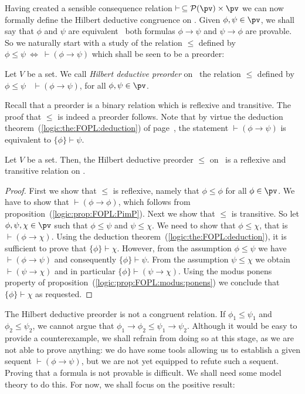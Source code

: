 Having created a sensible consequence relation $\vdash\,\subseteq
{\cal P}(\pv)\times\pv$ we can now formally define the Hilbert
deductive congruence on \pv. Given $\phi,\psi\in\pv$, we shall say
that $\phi$ and $\psi$ are equivalent \ifand\ both formulas
$\phi\to\psi$ and $\psi\to\phi$ are provable. So we naturally start
with a study of the relation $\leq$ defined by $\phi\leq\psi\
\Leftrightarrow\ \vdash(\phi\to\psi)$ which shall be seen to be a
preorder: \index{preorder@Hilbert deductive preorder}
\begin{defin}\label{logic:def:FOPL:HDC:quasiorder}
Let $V$ be a set. We call {\em Hilbert deductive preorder} on \pv\
the relation $\leq$ defined by $\phi\leq\psi$ \ifand\
$\vdash(\phi\to\psi)$, for all $\phi,\psi\in\pv$.
\end{defin}
Recall that a preorder is a binary relation which is reflexive and
transitive. The proof that $\leq$ is indeed a preorder follows. Note
that by virtue the deduction
theorem~(\ref{logic:the:FOPL:deduction}) of
page~\pageref{logic:the:FOPL:deduction}, the statement
$\vdash(\phi\to\psi)$ is equivalent to $\{\phi\}\vdash\psi$.
\begin{prop}\label{logic:prop:FOPL:quasiorder}
Let $V$ be a set. Then, the Hilbert deductive preorder $\leq$ on
\pv\ is a reflexive and transitive relation on \pv.
\end{prop}
\begin{proof}
First we show that $\leq$ is reflexive, namely that $\phi\leq\phi$
for all $\phi\in\pv$. We have to show that $\vdash (\phi\to\phi)$,
which follows from proposition~(\ref{logic:prop:FOPL:PimP}). Next we
show that $\leq$ is transitive. So let $\phi,\psi,\chi\in\pv$ such
that $\phi\leq\psi$ and $\psi\leq\chi$. We need to show that
$\phi\leq\chi$, that is $\vdash(\phi\to\chi)$. Using the deduction
theorem~(\ref{logic:the:FOPL:deduction}), it is sufficient to prove
that $\{\phi\}\vdash\chi$. However, from the assumption
$\phi\leq\psi$ we have $\vdash(\phi\to\psi)$ and consequently
$\{\phi\}\vdash\psi$. From the assumption $\psi\leq\chi$ we obtain
$\vdash(\psi\to\chi)$ and in particular
$\{\phi\}\vdash(\psi\to\chi)$. Using the modus ponens property of
proposition~(\ref{logic:prop:FOPL:modus:ponens}) we conclude that
$\{\phi\}\vdash\chi$ as requested.
\end{proof}

The Hilbert deductive preorder is not a congruent relation. If
$\phi_{1}\leq\psi_{1}$ and $\phi_{2}\leq\psi_{2}$, we cannot argue
that $\phi_{1}\to\phi_{2}\leq\psi_{1}\to\psi_{2}$. Although it would
be easy to provide a counterexample, we shall refrain from doing so
at this stage, as we are not able to prove anything: we do have some
tools allowing us to establish a given sequent
$\vdash(\phi\to\psi)$, but we are not yet equipped to refute such a
sequent. Proving that a formula is not provable is difficult. We
shall need some model theory to do this. For now, we shall focus on
the positive result:

